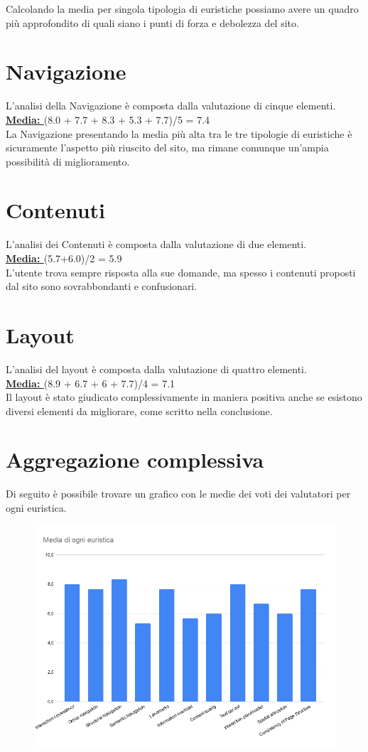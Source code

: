 Calcolando la media per singola tipologia di euristiche possiamo avere un quadro
più approfondito di quali siano i punti di forza e debolezza del sito.
\section{\textbf{Navigazione}}
L'analisi della Navigazione è composta dalla valutazione di cinque elementi.\\
\textbf{\underline{Media: }}(8.0 + 7.7 + 8.3 + 5.3 + 7.7)/5 = 7.4 \\
La Navigazione presentando la media più alta tra le tre tipologie di euristiche è sicuramente
l'aspetto più riuscito del sito, ma rimane comunque un'ampia possibilità di miglioramento.

\section{\textbf{Contenuti}}
L'analisi dei Contenuti è composta dalla valutazione di due elementi.\\
\textbf{\underline{Media: }} (5.7+6.0)/2 = 5.9\\ L'utente trova sempre risposta alla sue
domande, ma spesso i contenuti proposti dal sito sono sovrabbondanti e
confusionari.


\section{\textbf{Layout}}
L'analisi del layout è composta dalla valutazione di quattro elementi.\\
\textbf{\underline{Media: }}(8.9 + 6.7 + 6 + 7.7)/4 = 7.1\\
Il layout è stato giudicato complessivamente in maniera positiva anche se
esistono diversi elementi da migliorare, come scritto nella conclusione. 
\section{\textbf{Aggregazione complessiva}}
Di seguito è possibile trovare un grafico 
    con le medie dei voti dei valutatori per ogni euristica.
    \begin{figure}[H]
        \centering
        \includegraphics[scale=0.43]{resources/images/graficoMedieEuristiche.png}
    \end{figure}

